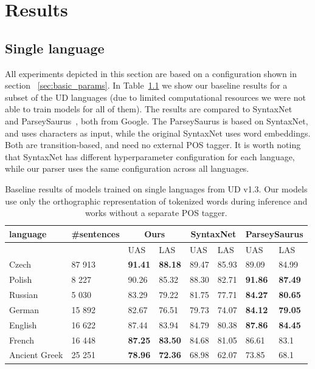 \chapter{Results}

\section{Single language}
All experiments depicted in this section are based on a configuration shown in section
~\ref{sec:basic_params}. In Table~\ref{tab:universal} we show our baseline results
for a subset of the UD languages (due to limited computational resources we were
not able to train models for all of them). The results are compared to
SyntaxNet~\cite{andor_globally_2016} and ParseySaurus~\cite{alberti_parsey_saurus_2017},
both from Google. The ParseySaurus is based on SyntaxNet, and uses characters
as input, while the original SyntaxNet uses word embeddings. Both are transition-based,
and need no external POS tagger.
It is worth noting that SyntaxNet has different hyperparameter configuration
for each language, while our parser uses the same configuration across all languages.

\begin{table}[!htbp]
  \centering
  \begin{tabular}{l l | l l | l l | l l}
    language & \#sentences & \multicolumn{2}{c|}{Ours} & \multicolumn{2}{c|}{SyntaxNet} & \multicolumn{2}{c}{ParseySaurus} \\ \hline
    & & UAS & LAS & UAS & LAS & UAS & LAS\\ \hline
    Czech & 87 913 & \textbf{91.41} & \textbf{88.18} & 89.47 & 85.93 & 89.09 & 84.99 \\
    Polish & 8 227 & 90.26 & 85.32 & 88.30 & 82.71 & \textbf{91.86} & \textbf{87.49}\\
    Russian & 5 030 & 83.29 & 79.22 & 81.75 & 77.71 & \textbf{84.27} & \textbf{80.65} \\
    German & 15 892 & 82.67 & 76.51 & 79.73 & 74.07 & \textbf{84.12} & \textbf{79.05}\\
    English & 16 622 & 87.44 & 83.94 & 84.79 & 80.38 & \textbf{87.86} & \textbf{84.45}\\ 
    French & 16 448 & \textbf{87.25} & \textbf{83.50} & 84.68 & 81.05 & 86.61 & 83.1\\
    Ancient Greek & 25 251 & \textbf{78.96} & \textbf{72.36} & 68.98 & 62.07 & 73.85 & 68.1
  \end{tabular}
  \caption{Baseline results of models trained on single languages from
    UD v1.3. Our models use only the orthographic representation of
    tokenized words during inference and works without a separate POS tagger.}
  \label{tab:universal}
\end{table}

